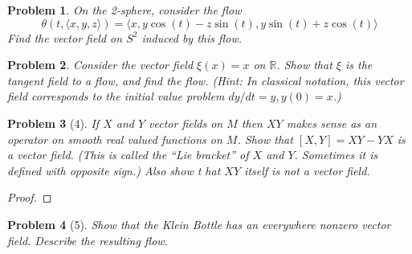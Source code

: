 \documentclass[10pt]{article}
\newcommand{\sk}{\vskip 10mm}
\newcommand{\bb}[1]{\mathbb{#1}}
\theoremstyle{plain}
\newtheorem{problem}{Problem}
\theoremstyle{remark}
\begin{document}
\begin{problem}
  On the 2-sphere, consider the flow
  \[
    \theta(t,\langle x,y,z\rangle)
    =\langle x,y\cos(t)-z\sin(t),y\sin(t)+z\cos(t)\rangle
  \]
  Find the vector field on $S^2$ induced by this flow.
\end{problem}

\sk

\begin{problem}
  Consider the vector field $\xi(x)=x$ on $\bb{R}$. Show that $\xi$ is the
  tangent field to a flow, and find the flow. (Hint: In classical notation,
  this vector field corresponds to the initial value problem $dy/dt=y,y(0)=x$.)
\end{problem}

\sk

\begin{problem}[4]
  If $X$ and $Y$ vector fields on $M$ then $XY$ makes sense as an operator
  on smooth real valued functions on $M$. Show that $[X,Y]=XY-YX$ is a vector
  field. (This is called the ``Lie bracket'' of $X$ and $Y$. Sometimes it is
  defined with opposite sign.) Also show t hat $XY$ itself is not a vector
  field.
\end{problem}

\begin{proof}
  
\end{proof}

\sk

\begin{problem}[5]
  Show that the Klein Bottle has an everywhere nonzero vector field.
  Describe the resulting flow.
\end{problem}

\end{document}
